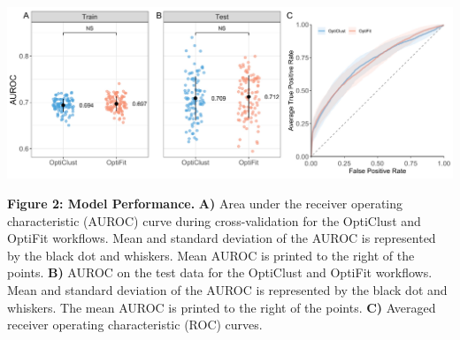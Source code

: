 \documentclass[
]{article}
\begin{document}
\includegraphics{../exploratory/figures/figure2.pdf}

\textbf{Figure 2: Model Performance.} \textbf{A)} Area under the
receiver operating characteristic (AUROC) curve during cross-validation
for the OptiClust and OptiFit workflows. Mean and standard deviation of
the AUROC is represented by the black dot and whiskers. Mean AUROC is
printed to the right of the points. \textbf{B)} AUROC on the test data
for the OptiClust and OptiFit workflows. Mean and standard deviation of
the AUROC is represented by the black dot and whiskers. The mean AUROC
is printed to the right of the points. \textbf{C)} Averaged receiver
operating characteristic (ROC) curves.
\end{document}
